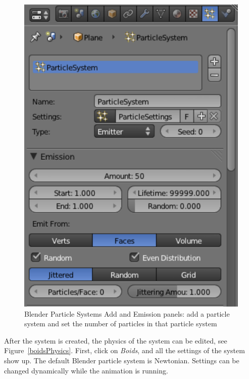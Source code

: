 \begin{figure}[htbp]
\begin{center}
\includegraphics[scale= 0.5]{figures/boidsCreatePS.pdf} 
\caption{Blender Particle Systems Add and Emission panels: add a particle system and set the number of particles in that particle system}
\label{boidsCreatePS}
\end{center}
\end{figure}

After the system is created, the physics of the system can be edited, see Figure~\ref{boidsPhysics}. First, click on \textit{Boids}, and all the settings of the system show up. The default Blender particle system is Newtonian. Settings can be changed dynamically while the animation is running.

